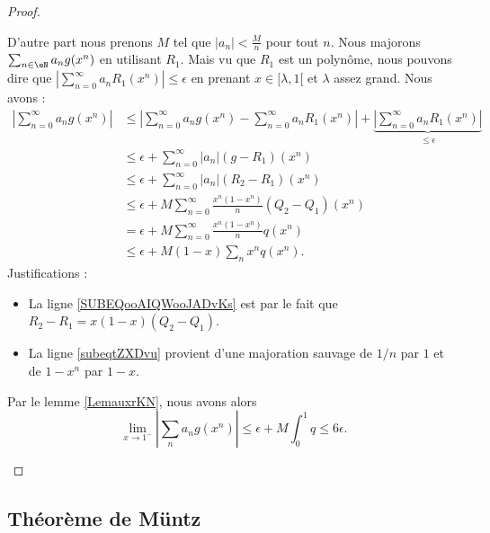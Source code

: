 \begin{proof}
\begin{subproof}
        D'autre part nous prenons \( M\) tel que \( | a_n |<\frac{ M }{ n }\) pour tout \( n\). Nous majorons \( \sum_{n \in \eN}a_ng(x^n)\) en utilisant \( R_1\). Mais vu que \( R_1\) est un polynôme, nous pouvons dire que \( | \sum_{n=0}^{\infty}a_nR_1(x^n) |\leq \epsilon\) en prenant \( x\in\mathopen[ \lambda , 1 [\) et \( \lambda\) assez grand. Nous avons :
        \begin{subequations}
            \begin{align}
                \left| \sum_{n=0}^{\infty}a_ng(x^n) \right| &\leq\left| \sum_{n=0}^{\infty}a_ng(x^n)-\sum_{n=0}^{\infty}a_nR_1(x^n) \right| +\underbrace{\left| \sum_{n=0}^{\infty}a_nR_1(x^n) \right|}_{\leq \epsilon} \\
                &\leq \epsilon+\sum_{n=0}^{\infty}| a_n |(g-R_1)(x^n)\\
                &\leq \epsilon+\sum_{n=0}^{\infty}| a_n |(R_2-R_1)(x^n)\\
                &\leq \epsilon+M\sum_{n=0}^{\infty}\frac{ x^n(1-x^n) }{ n }(Q_2-Q_1)(x^n) \label{SUBEQooAIQWooJADvKs} \\
                &=\epsilon+M\sum_{n=0}^{\infty}\frac{ x^n(1-x^n) }{ n }q(x^n)\\
                &\leq \epsilon+M(1-x)\sum_nx^nq(x^n).   \label{subeqtZXDvu}
            \end{align}
        \end{subequations}  
        Justifications :
        \begin{itemize}
            \item La ligne \eqref{SUBEQooAIQWooJADvKs} est par le fait que $R_2-R_1=x(1-x)(Q_2-Q_1)$.
            \item La ligne \eqref{subeqtZXDvu} provient d'une majoration sauvage de \( 1/n\) par \( 1\) et de \( 1-x^n\) par \( 1-x\). 
        \end{itemize}
        Par le lemme \ref{LemauxrKN}, nous avons alors
        \begin{equation}
            \lim_{x\to 1^-} | \sum_na_ng(x^n) |\leq \epsilon+M\int_0^1q\leq 6\epsilon.
        \end{equation}
    \end{subproof}
\end{proof}

\subsection{Théorème de Müntz}

